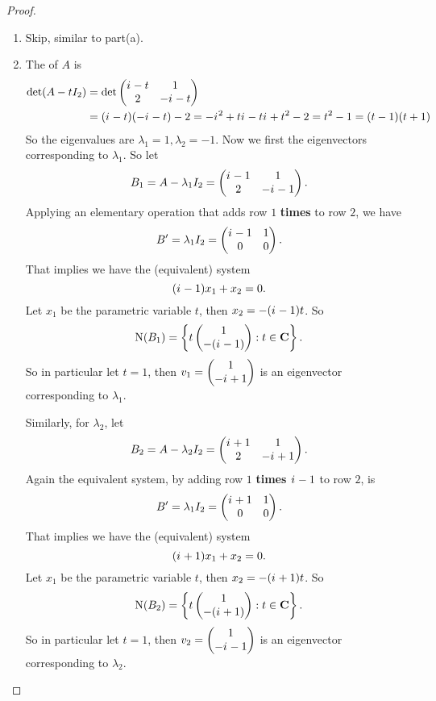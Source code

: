 \begin{proof}
\begin{enumerate}
\item Skip, similar to part(a).

\item The \CPOLY{} of \(A\) is
\begin{align*}
    \det(A - tI_2) & = \det \begin{pmatrix}
        {i\mkern1mu} - t & 1 \\ 2 & -{i\mkern1mu} - t
    \end{pmatrix} \\
        & = ({i\mkern1mu} - t)(-{i\mkern1mu} - t) - 2 = -{i\mkern1mu}^2 + t{i\mkern1mu} - t{i\mkern1mu} + t^2 - 2 = t^2 - 1 = (t - 1)(t + 1)
\end{align*}
So the eigenvalues are \(\lambda_1 = 1, \lambda_2 = -1\).
Now we first the eigenvectors corresponding to \(\lambda_1\).
So let
\[
    B_1 = A - \lambda_1 I_2 = \begin{pmatrix}
        {i\mkern1mu} - 1 & 1 \\ 2 & -{i\mkern1mu} - 1
    \end{pmatrix}.
\]
Applying an elementary operation that adds row \(1\) \textbf{times } to row \(2\), we have
\[
    B' = \lambda_1 I_2 = \begin{pmatrix}
        {i\mkern1mu} - 1 & 1 \\ 0 & 0
    \end{pmatrix}.
\]
That implies we have the (equivalent) system
\[
    ({i\mkern1mu} - 1) x_1 + x_2 = 0.
\]
Let \(x_1\) be the parametric variable \(t\), then \(x_2 = -({i\mkern1mu} - 1)t\).
So
\[
    \mathrm{N}(B_1) = \left\{ t \begin{pmatrix} 1 \\ -({i\mkern1mu} - 1) \end{pmatrix} : t \in \mathbf{C} \right\}.
\]
So in particular let \(t = 1\), then \(v_1 = \begin{pmatrix} 1 \\ -{i\mkern1mu} + 1 \end{pmatrix}\) is an eigenvector corresponding to \(\lambda_1\).

Similarly, for \(\lambda_2\), let
\[
    B_2 = A - \lambda_2 I_2 = \begin{pmatrix}
        {i\mkern1mu} + 1 & 1 \\ 2 & -{i\mkern1mu} + 1
    \end{pmatrix}.
\]
Again the equivalent system, by adding row \(1\) \textbf{times \({i\mkern1mu} - 1\)} to row \(2\), is
\[
    B' = \lambda_1 I_2 = \begin{pmatrix}
        {i\mkern1mu} + 1 & 1 \\ 0 & 0
    \end{pmatrix}.
\]
That implies we have the (equivalent) system
\[
    ({i\mkern1mu} + 1) x_1 + x_2 = 0.
\]
Let \(x_1\) be the parametric variable \(t\), then \(x_2 = -({i\mkern1mu} + 1)t\).
So
\[
    \mathrm{N}(B_2) = \left\{ t \begin{pmatrix} 1 \\ -({i\mkern1mu} + 1) \end{pmatrix} : t \in \mathbf{C} \right\}.
\]
So in particular let \(t = 1\), then \(v_2 = \begin{pmatrix} 1 \\ -{i\mkern1mu} - 1 \end{pmatrix}\) is an eigenvector corresponding to \(\lambda_2\).


\end{enumerate}
\end{proof}
